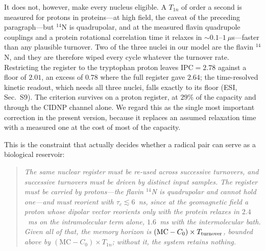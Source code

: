 \documentclass[aps,prx,reprint,superscriptaddress,nofootinbib,floatfix]{revtex4-2}
\begin{document}
It does not, however, make every nucleus eligible. A $T_{1n}$ of order a second
is measured for protons in proteins\cite{Tjandra1995}---at high field, the
caveat of the preceding paragraph---but $^{14}$N is
quadrupolar, and at the measured flavin quadrupole couplings and a protein
rotational correlation time it relaxes in $\sim0.1$--$1~\mu$s---faster than any
plausible turnover. Two of the three nuclei in our model are the flavin $^{14}$N,
and they are therefore wiped every cycle whatever the turnover rate. Restricting
the register to the tryptophan proton leaves $\mathrm{IPC}=2.78$ against a floor
of $2.01$, an excess of $0.78$ where the full register gave $2.64$; the
time-resolved kinetic readout, which needs all three nuclei, falls exactly to its
floor (ESI, Sec.~S9). The criterion survives on a proton
register, at $29\%$ of the capacity and through the CIDNP channel alone. We
regard this as the single most important correction in the present version,
because it replaces an assumed relaxation time with a measured one at the cost of
most of the capacity.

This is the constraint that actually decides whether a radical pair can serve as a
biological reservoir:

\begin{quote}
\emph{The same nuclear register must be re-used across successive turnovers, and
successive turnovers must be driven by distinct input samples. The register must
be carried by protons---the flavin $^{14}$N is quadrupolar and cannot hold
one---and must reorient with $\tau_c\lesssim6$~ns, since at the geomagnetic field
a proton whose dipolar vector reorients only with the protein relaxes in
$2.4$~ms on the intramolecular term alone, $1.6$~ms with the intermolecular bath. Given all of that, the memory
horizon is $(\mathrm{MC}-C_0)\times T_{\rm turnover}$, bounded above by
$(\mathrm{MC}-C_0)\times T_{1n}$; without it, the system retains nothing.}
\end{quote}
\end{document}
